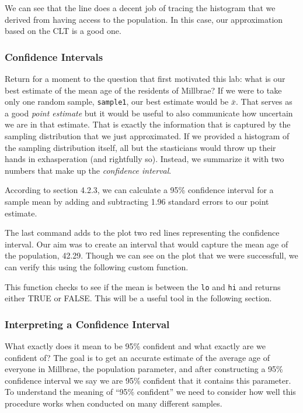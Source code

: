 \documentclass[11pt]{article}
\begin{document}

We can see that the line does a decent job of tracing the histogram that we derived from having access to the population.  In this case, our approximation based on the CLT is a good one.

\subsubsection*{Confidence Intervals}
Return for a moment to the question that first motivated this lab: what is our best estimate of the mean age of the residents of Millbrae?  If we were to take only one random sample, \texttt{sample1}, our best estimate would be $\bar{x}$.  That serves as a good \emph{point estimate} but it would be useful to also communicate how uncertain we are in that estimate.  That is exactly the information that is captured by the sampling distribution that we just approximated.  If we provided a histogram of the sampling distribution itself, all but the stasticians would throw up their hands in exhasperation (and rightfully so).  Instead, we summarize it with two numbers that make up the \emph{confidence interval}.

According to section 4.2.3, we can calculate a 95\% confidence interval for a sample mean by adding and subtracting 1.96 standard errors to our point estimate.


The last command adds to the plot two red lines representing the confidence interval.  Our aim was to create an interval that would capture the mean age of the population, 42.29.  Though we can see on the plot that we were successfull, we can verify this using the following custom function.


This function checks to see if the mean is between the \texttt{lo} and \texttt{hi} and returns either TRUE or FALSE.  This will be a useful tool in the following section.


\subsubsection*{Interpreting a Confidence Interval}
What exactly does it mean to be 95\% confident and what exactly are we confident of?  The goal is to get an accurate estimate of the average age of everyone in Millbrae, the population parameter, and after constructing a 95\% confidence interval we say we are 95\% confident that it contains this parameter.  To understand the meaning of ``95\% confident'' we need to consider how well this procedure works when conducted on many different samples.
\end{document}
